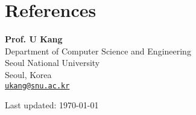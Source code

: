 \documentclass[11pt,a4paper]{article}
\renewenvironment{itemize}{
  \begin{list}{}{
    \setlength{\leftmargin}{1.5em}
    \setlength{\itemsep}{0.5em}
    \setlength{\parskip}{0pt}
    \setlength{\parsep}{0.25em}
  }
}{
  \end{list}
}
\begin{document}
\section*{References}
\begin{itemize}
  \item \textbf{Prof. U Kang}\\
        Department of Computer Science and Engineering\\
        Seoul National University\\
        Seoul, Korea\\
        \href{mailto:ukang@snu.ac.kr}{\tt ukang@snu.ac.kr}
\end{itemize}

\bigskip
{\small Last updated: \today}
\end{document}
